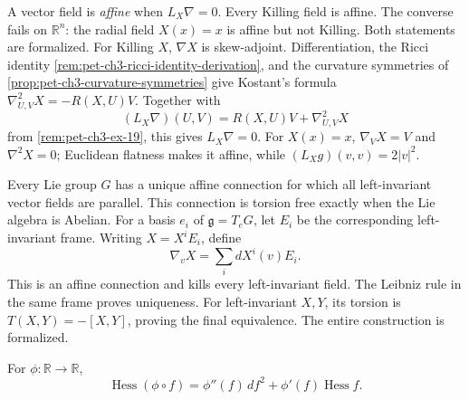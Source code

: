 \begin{remark}
  \label{rem:pet-ch2-ex-13}
  \leanok
  A vector field is \emph{affine} when
  $L_X\nabla=0$. Every Killing field is affine. The converse fails on
  $\mathbb{R}^n$: the radial field $X(x)=x$ is affine but not Killing. Both
  statements are formalized.
  \sketch
  For Killing $X$, $\nabla X$ is skew-adjoint. Differentiation, the Ricci
  identity \cref{rem:pet-ch3-ricci-identity-derivation}, and the curvature
  symmetries of \cref{prop:pet-ch3-curvature-symmetries} give Kostant's formula
  $\nabla^2_{U,V}X=-R(X,U)V$. Together with
  \[
    (L_X\nabla)(U,V)=R(X,U)V+\nabla^2_{U,V}X
  \]
  from \cref{rem:pet-ch3-ex-19}, this gives $L_X\nabla=0$. For $X(x)=x$,
  $\nabla_VX=V$ and $\nabla^2X=0$; Euclidean flatness makes it affine, while
  $(L_Xg)(v,v)=2|v|^2$.
\end{remark}

\begin{remark}
  \label{rem:pet-ch2-ex-14}
  \leanok
  Every Lie group $G$ has a unique affine
  connection for which all left-invariant vector fields are parallel. This
  connection is torsion free exactly when the Lie algebra is Abelian.
  \sketch
  For a basis $e_i$ of $\mathfrak g=T_eG$, let $E_i$ be the corresponding
  left-invariant frame. Writing $X=X^iE_i$, define
  \[
    \nabla_vX=\sum_i dX^i(v)E_i.
  \]
  This is an affine connection and kills every left-invariant field.
  The Leibniz rule in the same frame proves uniqueness. For left-invariant
  $X,Y$, its torsion is $T(X,Y)=-[X,Y]$, proving the final equivalence. The
  entire construction is formalized.
\end{remark}

\begin{remark}
  \label{rem:pet-ch2-ex-15}
  \leanok
  For $\phi:\mathbb{R}\to\mathbb{R}$,
  \[
    \operatorname{Hess}(\phi\circ f)
      =\phi''(f)\,df^2+\phi'(f)\operatorname{Hess}f.
  \]
\end{remark}

